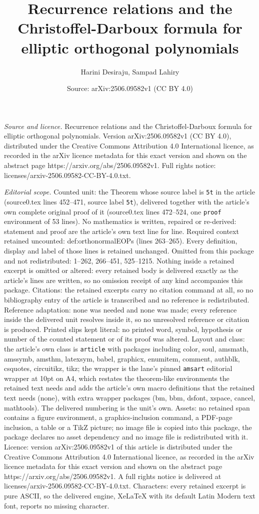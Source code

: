 \documentclass[10pt,a4paper]{amsart}
\title[Recurrence relations and the Christoffel-Darboux formula for]{Recurrence relations and the Christoffel-Darboux formula for elliptic orthogonal polynomials}
\author{Harini Desiraju, Sampad Lahiry}
\date{Source: arXiv:2506.09582v1 (CC BY 4.0)}
\begin{document}
\maketitle

\noindent\emph{Source and licence.} Recurrence relations and the Christoffel-Darboux formula for elliptic orthogonal polynomials. Version arXiv:2506.09582v1 (CC BY 4.0), distributed under the Creative Commons Attribution 4.0 International licence, as recorded in the arXiv licence metadata for this exact version and shown on the abstract page https://arxiv.org/abs/2506.09582v1. Full rights notice: licenses/arxiv-2506.09582-CC-BY-4.0.txt.\par\smallskip

\noindent\textit{Editorial scope.} Counted unit: the Theorem whose source label is \texttt{5t} in the article (source0.tex lines 452--471, source label \texttt{5t}), delivered together with the article's own complete original proof of it (source0.tex lines 472--524, one \texttt{proof} environment of 53 lines). No mathematics is written, repaired or re-derived: statement and proof are the article's own text line for line. Required context retained uncounted: def:orthonormalEOPs (lines 263--265). Every definition, display and label of those lines is retained unchanged. Omitted from this package and not redistributed: 1--262, 266--451, 525--1215. Nothing inside a retained excerpt is omitted or altered: every retained body is delivered exactly as the article's lines are written, so no omission receipt of any kind accompanies this package. Citations: the retained excerpts carry no citation command at all, so no bibliography entry of the article is transcribed and no reference is redistributed. Reference adaptation: none was needed and none was made; every reference inside the delivered unit resolves inside it, so no unresolved reference or citation is produced. Printed slips kept literal: no printed word, symbol, hypothesis or number of the counted statement or of its proof was altered. Layout and class: the article's own class is \texttt{article} with packages including color, soul, amsmath, amssymb, amsthm, latexsym, babel, graphicx, enumitem, comment, authblk, csquotes, circuitikz, tikz; the wrapper is the lane's pinned \texttt{amsart} editorial wrapper at 10pt on A4, which restates the theorem-like environments the retained text needs and adds the article's own macro definitions that the retained text needs (none), with extra wrapper packages (bm, bbm, dsfont, xspace, cancel, mathtools). The delivered numbering is the unit's own. Assets: no retained span contains a figure environment, a graphics-inclusion command, a PDF-page inclusion, a table or a TikZ picture; no image file is copied into this package, the package declares no asset dependency and no image file is redistributed with it. Licence: version arXiv:2506.09582v1 of this article is distributed under the Creative Commons Attribution 4.0 International licence, as recorded in the arXiv licence metadata for this exact version and shown on the abstract page https://arxiv.org/abs/2506.09582v1. A full rights notice is delivered at licenses/arxiv-2506.09582-CC-BY-4.0.txt. Characters: every retained excerpt is pure ASCII, so the delivered engine, XeLaTeX with its default Latin Modern text font, reports no missing character.
\end{document}
